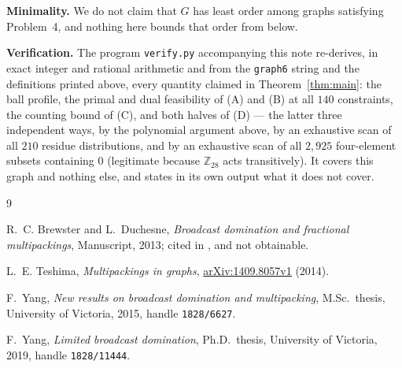 \documentclass[11pt]{amsart}
\theoremstyle{remark}
\newcommand{\Zn}[1]{\mathbb Z_{#1}}
\begin{document}
\medskip
\noindent\textbf{Minimality.} We do not claim that $G$ has least order among graphs
satisfying Problem~4, and nothing here bounds that order from below.

\medskip
\noindent\textbf{Verification.} The program \texttt{verify.py} accompanying this note
re-derives, in exact integer and rational arithmetic and from the \texttt{graph6} string
and the definitions printed above, every quantity claimed in Theorem~\ref{thm:main}: the
ball profile, the primal and dual feasibility of (A) and (B) at all $140$ constraints, the
counting bound of (C), and both halves of (D) --- the latter three independent ways, by the
polynomial argument above, by an exhaustive scan of all $210$ residue distributions, and by an exhaustive scan of all $2{,}925$ four-element subsets containing $0$ (legitimate because
$\Zn{28}$ acts transitively). It covers this graph and nothing else, and states in its own
output what it does not cover.

\begin{thebibliography}{9}

R.~C. Brewster and L.~Duchesne,
\emph{Broadcast domination and fractional multipackings},
Manuscript, 2013; cited in \cite{Teshima2014}, and not obtainable.

L.~E. Teshima,
\emph{Multipackings in graphs},
\href{https://arxiv.org/abs/1409.8057}{arXiv:1409.8057v1} (2014).

F.~Yang,
\emph{New results on broadcast domination and multipacking},
M.Sc.\ thesis, University of Victoria, 2015, handle \texttt{1828/6627}.

F.~Yang,
\emph{Limited broadcast domination},
Ph.D.\ thesis, University of Victoria, 2019, handle \texttt{1828/11444}.

\end{thebibliography}
\end{document}

